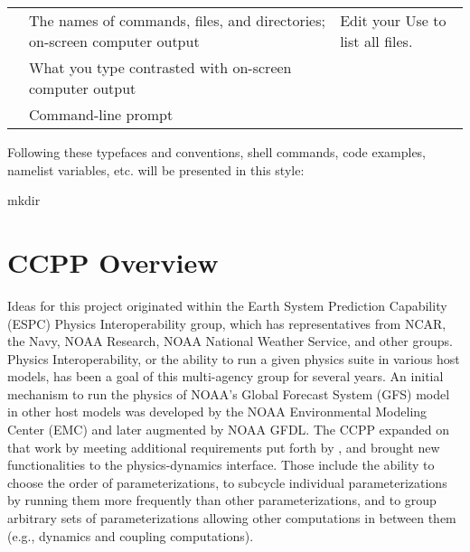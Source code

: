 \documentclass[letterpaper,10pt,english]{sphinxmanual}
\begin{document}
\begin{savenotes}\sphinxattablestart
\centering
\begin{tabulary}{\linewidth}[t]{|T|T|T|}
\hline
\sphinxstyletheadfamily 
{}
&\sphinxstyletheadfamily 
{}
&\sphinxstyletheadfamily 
{}
\\
\hline
{}
&
The names of commands,
files, and directories; 
on-screen computer output
&
Edit your  
Use  to list all files. 
\\
\hline
{}
&
What you type contrasted
with on-screen computer
output
&
 
\\
\hline
\sphinxcode{\sphinxupquote{\%}}
&
Command-line prompt
&
\\
\hline
\end{tabulary}
\par
\sphinxattableend\end{savenotes}

Following these typefaces and conventions, shell commands, code examples, namelist variables, etc.
will be presented in this style:

\begin{sphinxVerbatim}[commandchars=\\\{\}]
 mkdir 
\end{sphinxVerbatim}


\chapter{CCPP Overview}
\label{\detokenize{Overview:ccpp-overview}}\label{\detokenize{Overview:overview}}\label{\detokenize{Overview::doc}}
Ideas for this project originated within the Earth System Prediction Capability (ESPC)
Physics Interoperability group, which has representatives from NCAR, the Navy, NOAA
Research, NOAA National Weather Service, and other groups. Physics Interoperability,
or the ability to run a given physics suite in various host models, has been a goal
of this multi-agency group for several years. An initial mechanism to run the physics
of NOAA’s Global Forecast System (GFS) model in other host models was developed by
the NOAA Environmental Modeling Center (EMC) and later augmented by NOAA GFDL.  The
CCPP expanded on that work by meeting additional requirements put forth by
,
and brought new functionalities to the physics-dynamics interface. Those include
the ability to choose the order of parameterizations, to subcycle individual
parameterizations by running them more frequently than other parameterizations,
and to group arbitrary sets of parameterizations allowing other computations in
between them (e.g., dynamics and coupling computations).
\end{document}
